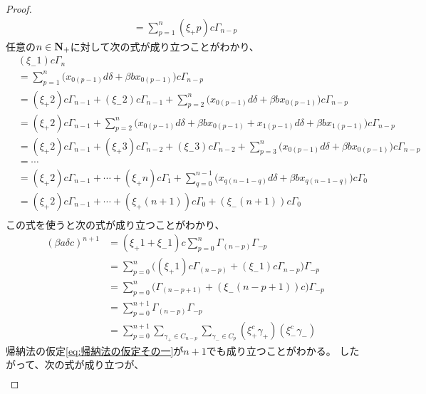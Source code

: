 {\begin{proof}
\begin{equation*}
\begin{split}
			= \sum_{p=1}^n (\xi_+p)c \Gamma_{n-p}
		\end{split}\end{equation*}
		任意の$n\in\mathbf{N}_+$に対して次の式が成り立つことがわかり、
		\begin{equation*}\begin{split}
			&(\xi_-1)c\Gamma_n \\
			&= \sum_{p=1}^n \bigl(x_{0(p-1)}d\delta + \beta bx_{0(p-1)}\bigr)c \Gamma_{n-p} \\
			&= (\xi_+2)c\Gamma_{n-1} + (\xi_-2)c\Gamma_{n-1}
				+ \sum_{p=2}^n \bigl(x_{0(p-1)}d\delta + \beta bx_{0(p-1)}\bigr)c \Gamma_{n-p} \\
			&= (\xi_+2)c\Gamma_{n-1}
				+ \sum_{p=2}^n \bigl(
					x_{0(p-1)}d\delta + \beta bx_{0(p-1)} + x_{1(p-1)}d\delta + \beta bx_{1(p-1)}
				\bigr)c \Gamma_{n-p} \\
			&= (\xi_+2)c\Gamma_{n-1} + (\xi_+3)c\Gamma_{n-2} + (\xi_-3)c\Gamma_{n-2}
				+ \sum_{p=3}^n \bigl(x_{0(p-1)}d\delta + \beta bx_{0(p-1)}\bigr)c \Gamma_{n-p} \\
			&= \cdots \\
			&= (\xi_+2)c\Gamma_{n-1} +\cdots+ (\xi_+n)c\Gamma_1 + \sum_{q=0}^{n-1}
				\bigl(x_{q(n-1-q)}d\delta + \beta bx_{q(n-1-q)}\bigr)c \Gamma_0 \\
			&= (\xi_+2)c\Gamma_{n-1} +\cdots+ (\xi_+(n+1))c\Gamma_0 
				+ (\xi_-(n+1))c\Gamma_0 \\
		\end{split}\end{equation*}
		この式を使うと次の式が成り立つことがわかり、
		\begin{equation*}\begin{split}
			(\beta a\delta c)^{n+1} 
			&= (\xi_+1+\xi_-1)c \sum_{p=0}^n \Gamma_{(n-p)}\Gamma_{-p} \\
			&=  \sum_{p=0}^n \biggl(
				(\xi_+1)c\Gamma_{(n-p)} + (\xi_-1)c\Gamma_{n-p}\biggr)\Gamma_{-p} \\
			&=  \sum_{p=0}^n \biggl(
				\Gamma_{(n-p+1)} + (\xi_-(n-p+1))c\biggr)\Gamma_{-p} \\
			&= \sum_{p=0}^{n+1} \Gamma_{(n-p)}\Gamma_{-p} \\
			&= \sum_{p=0}^{n+1} \sum_{\gamma_+\in C_{n-p}}
				\sum_{\gamma_-\in C_p} (\xi_+^c\gamma_+)(\xi_-^c\gamma_-)
		\end{split}\end{equation*}
		帰納法の仮定\eqref{eq:帰納法の仮定その一}が$n+1$でも成り立つことがわかる。
		したがって、次の式が成り立つが、
		\begin{equation*}\begin{split}

\end{split}
\end{equation*}
\end{proof}}
